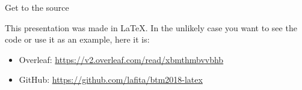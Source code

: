 \documentclass[inputenc]{beamer}
\begin{document}
\begin{frame}{Get to the source}
    
    This presentation was made in LaTeX.
    In the unlikely case you want to see the code or use it as an example, here it is:
    
    \begin{itemize}
        \item Overleaf: \url{https://v2.overleaf.com/read/xbmthmbvvbhb}
        \item GitHub: \url{https://github.com/lafita/btm2018-latex}
    \end{itemize}
    
\end{frame}
\end{document}
